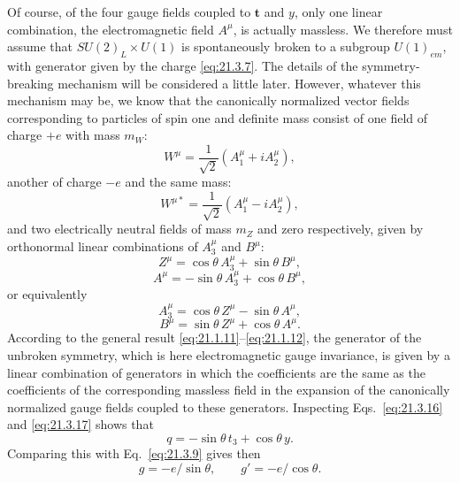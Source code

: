 Of course, of the four gauge fields coupled to $\mathbf{t}$ and $y$, only one linear combination, the electromagnetic field $A^\mu$, is actually massless. We therefore must assume that $SU(2)_L\times U(1)$ is spontaneously broken to a subgroup $U(1)_{em}$, with generator given by the charge \eqref{eq:21.3.7}. The details of the symmetry-breaking mechanism will be considered a little later. However, whatever this mechanism may be, we know that the canonically normalized vector fields corresponding to particles of spin one and definite mass consist of one field of charge $+e$ with mass $m_W$:
\begin{equation}
W^\mu=\frac{1}{\sqrt{2}}\left(A_1^\mu+iA_2^\mu\right),
\tag{21.3.12}\label{eq:21.3.12}
\end{equation}
another of charge $-e$ and the same mass:
\begin{equation}
W^{\mu *}=\frac{1}{\sqrt{2}}\left(A_1^\mu-iA_2^\mu\right),
\tag{21.3.13}\label{eq:21.3.13}
\end{equation}
and two electrically neutral fields of mass $m_Z$ and zero respectively, given by orthonormal linear combinations of $A_3^\mu$ and $B^\mu$:
\begin{equation}
Z^\mu=\cos\theta\,A_3^\mu+\sin\theta\,B^\mu,
\tag{21.3.14}\label{eq:21.3.14}
\end{equation}
\begin{equation}
A^\mu=-\sin\theta\,A_3^\mu+\cos\theta\,B^\mu,
\tag{21.3.15}\label{eq:21.3.15}
\end{equation}
or equivalently
\begin{equation}
A_3^\mu=\cos\theta\,Z^\mu-\sin\theta\,A^\mu,
\tag{21.3.16}\label{eq:21.3.16}
\end{equation}
\begin{equation}
B^\mu=\sin\theta\,Z^\mu+\cos\theta\,A^\mu.
\tag{21.3.17}\label{eq:21.3.17}
\end{equation}
According to the general result \eqref{eq:21.1.11}--\eqref{eq:21.1.12}, the generator of the unbroken symmetry, which is here electromagnetic gauge invariance, is given by a linear combination of generators in which the coefficients are the same as the coefficients of the corresponding massless field in the expansion of the canonically normalized gauge fields coupled to these generators. Inspecting Eqs.~\eqref{eq:21.3.16} and \eqref{eq:21.3.17} shows that
\begin{equation}
q=-\sin\theta\,t_3+\cos\theta\,y.
\tag{21.3.18}\label{eq:21.3.18}
\end{equation}
Comparing this with Eq.~\eqref{eq:21.3.9} gives then
\begin{equation}
g=-e/\sin\theta,
\qquad
g'=-e/\cos\theta.
\tag{21.3.19}\label{eq:21.3.19}
\end{equation}


